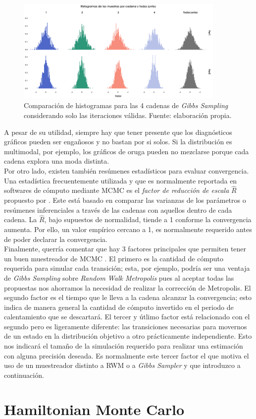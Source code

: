 \begin{figure}[h]
	\centering
	\includegraphics[width=0.9\textwidth]{Figs/Bayes/Ejemplos_Convergencia_Histogramas}
	\caption{Comparación de histogramas para las 4 cadenas de \textit{Gibbs Sampling} considerando solo las iteraciones válidas. Fuente: elaboración propia.}
	\label{fig:Conv_Hist}	
\end{figure}

A pesar de su utilidad, siempre hay que tener presente que los diagnósticos gráficos pueden ser engañosos y no bastan por si solos. Si la distribución es multimodal, por ejemplo, los gráficos de oruga pueden no mezclarse porque cada cadena explora una moda distinta.\\ 

Por otro lado, existen también resúmenes estadísticos para evaluar convergencia. Una estadística frecuentemente utilizada y que es normalmente reportada en softwares de cómputo mediante MCMC es el \textit{factor de reducción de escala} $\hat{R}$ propuesto por \textcite{GelmanRubin92}. Este está basado en comparar las varianzas de los parámetros o resúmenes inferenciales a través de las cadenas con aquellos dentro de cada cadena. La $\hat{R}$, bajo supuestos de normalidad, tiende a 1 conforme la convergencia aumenta. Por ello, un valor empírico cercano a 1, es normalmente requerido antes de poder declarar la convergencia.\\

Finalmente, querría comentar que hay 3 factores principales que permiten tener un buen muestreador de MCMC \parencite{Neal93}. El primero es la cantidad de cómputo requerida para simular cada transición; esta, por ejemplo, podría ser una ventaja de \textit{Gibbs Sampling} sobre \textit{Random Walk Metropolis} pues al aceptar todas las propuestas nos ahorramos la necesidad de realizar la corrección de Metropolis. El segundo factor es el tiempo que le lleva a la cadena alcanzar la convergencia; esto indica de manera general la cantidad de cómputo invertido en el periodo de calentamiento que se descartará. El tercer y útlimo factor está relacionado con el segundo pero es ligeramente diferente: las transiciones necesarias para movernos de un estado en la distribución objetivo a otro prácticamente independiente. Esto nos indicará el tamaño de la simulación requerido para realizar una estimación con alguna precisión deseada. Es normalmente este tercer factor el que motiva el uso de un muestreador distinto a RWM o a \textit{Gibbs Sampler} y que introduzco a continuación.

\section{Hamiltonian Monte Carlo}
